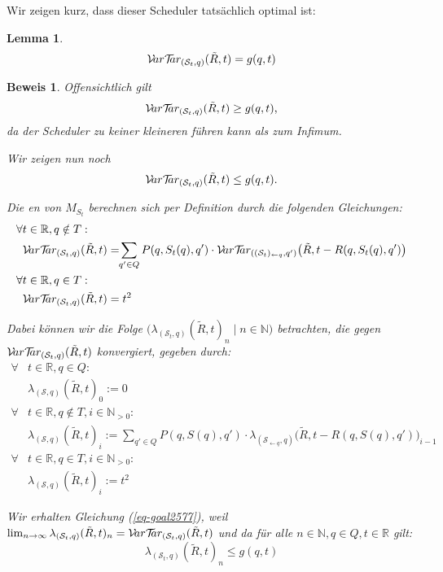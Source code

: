 \documentclass[a4paper]{article}
\newtheorem{lemma}[satz]{Lemma}
\theoremstyle{nonumberplain}
\newtheorem{beweis}{Beweis}
\begin{document}
Wir zeigen kurz, dass dieser Scheduler tatsächlich optimal ist:
\begin{lemma}
	\begin{equation}
		\mathcal{V}\!ar \mathcal{T}\!\!ar_{(\mathcal{S}_t,q)}(\tilde{R},t) = g(q,t)
	\end{equation}
\end{lemma}
\begin{beweis}
	Offensichtlich gilt 
	\[\mathcal{V}\!ar \mathcal{T}\!\!ar_{(\mathcal{S}_t,q)}(\tilde{R},t) \geq g(q,t)\text{,}\]
	da der Scheduler zu keiner kleineren \vt{} führen kann als zum Infimum.
	
	Wir zeigen nun noch
	\begin{equation}\label{eq-goal2577}
	\mathcal{V}\!ar \mathcal{T}\!\!ar_{(\mathcal{S}_t,q)}(\tilde{R},t) \leq g(q,t)\text{.}
	\end{equation}
	
	Die \vt{}en von $M_{S_t}$ berechnen sich per Definition durch die folgenden Gleichungen:
	\begin{align*}
	\forall & t \in \mathbb{R}, q \notin T : \\
	& \mvt_{(\mathcal{S}_t,q)}(\tilde{R},t) = \!\! \sum_{q' \in Q} P(q,S_t(q),q') \cdot \mvt_{((\mathcal{S}_t)_{\leftarrow q},q')}\big(\tilde{R},t - R(q,S_t(q),q')\big) \\
	\forall & t \in \mathbb{R}, q \in T : \\
	& \mvt_{(\mathcal{S}_t,q)}(\tilde{R},t) = t^2
	\end{align*}
	
	Dabei können wir die Folge $\big(\lambda_{(\mathcal{S}_t,q)}(\tilde{R},t)_n\mid n \in \mathbb{N}\big)$ betrachten, die gegen $\mathcal{V}\!ar \mathcal{T}\!\!ar_{(\mathcal{S}_t,q)}(\tilde{R},t)$ konvergiert, gegeben durch:
	\begin{align*}
	\forall & t \in \mathbb{R}, q \in Q: \\
	& \lambda_{(\mathcal{S},q)}(\tilde{R},t)_0 := 0 \\
	\forall & t \in \mathbb{R}, q \notin T, i \in \mathbb{N}_{>0}: \\
	& \lambda_{(\mathcal{S},q)}(\tilde{R},t)_i := \sum_{q' \in Q} P(q,S(q),q') \cdot \lambda_{(\mathcal{S}_{\leftarrow q},q)}\big(\tilde{R},t - R(q,S(q),q')\big)_{i-1} \\
	\forall & t \in \mathbb{R}, q \in T, i \in \mathbb{N}_{>0} : \\
	& \lambda_{(\mathcal{S},q)}(\tilde{R},t)_i := t^2
	\end{align*}
	
	Wir erhalten Gleichung (\ref{eq-goal2577}), weil $\lim_{n \to \infty}{\lambda_{(\mathcal{S}_t,q)}(\tilde{R},t)_n} = \mathcal{V}\!ar \mathcal{T}\!\!ar_{(\mathcal{S}_t,q)}(\tilde{R},t)$ und da für alle $n\in \mathbb{N}, q\in Q, t \in \mathbb{R}$ gilt:
	\[
		\lambda_{(\mathcal{S}_t,q)}(\tilde{R},t)_n \leq g(q,t)
	\]
	

\end{beweis}
\end{document}

